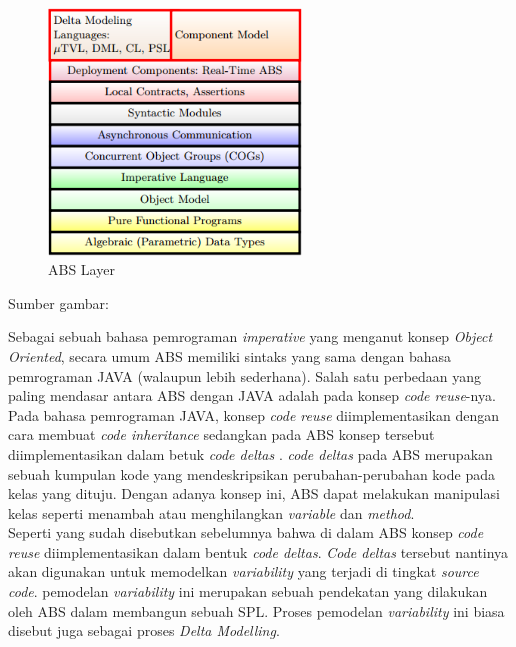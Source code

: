 \begin{figure}
    \centering
    \includegraphics[width=0.6\textwidth]
        {img/abs-layers.png}
    \caption{ABS Layer}
\end{figure}
\vspace{-0.8cm}
\begin{center}
{\small Sumber gambar: \citep{hahnle2013hats}}
\end{center}

\noindent
Sebagai sebuah bahasa pemrograman \textit{imperative} yang menganut konsep \textit{Object Oriented}, secara umum ABS memiliki sintaks yang sama dengan bahasa pemrograman JAVA (walaupun lebih sederhana). Salah satu perbedaan yang paling mendasar antara ABS dengan JAVA adalah pada konsep \textit{code reuse}-nya. Pada bahasa pemrograman JAVA, konsep \textit{code reuse} diimplementasikan dengan cara membuat \textit{code inheritance} sedangkan pada ABS konsep tersebut diimplementasikan dalam betuk \textit{code deltas} \citep{hahnle2013hats}. \textit{code deltas} pada ABS merupakan sebuah kumpulan kode yang mendeskripsikan perubahan-perubahan kode pada kelas yang dituju. Dengan adanya konsep ini, ABS dapat melakukan manipulasi kelas seperti menambah atau menghilangkan \textit{variable} dan \textit{method}. \\

\noindent
Seperti yang sudah disebutkan sebelumnya bahwa di dalam ABS konsep \textit{code reuse} diimplementasikan dalam bentuk \textit{code deltas}. \textit{Code deltas} tersebut nantinya akan digunakan untuk memodelkan \textit{variability} yang terjadi di tingkat \textit{source code}. pemodelan \textit{variability} ini merupakan sebuah pendekatan yang dilakukan oleh ABS dalam membangun sebuah SPL. Proses pemodelan \textit{variability} ini biasa disebut juga sebagai proses \textit{Delta Modelling}. \\


